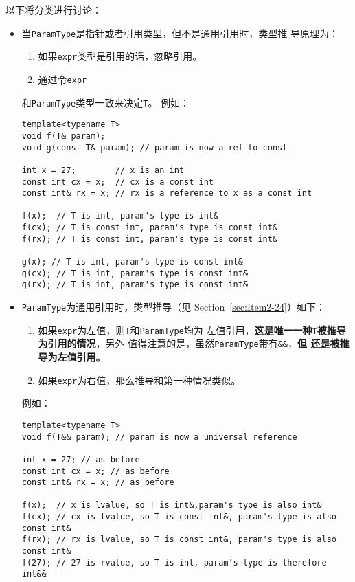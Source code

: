 以下将分类进行讨论：
\begin{itemize}
\item 当\texttt{ParamType}是指针或者引用类型，但不是通用引用时，类型推
  导原理为：
    \begin{enumerate}
    \item 如果\texttt{expr}类型是引用的话，忽略引用。
    \item 通过令\texttt{expr}
    \end{enumerate}
    和\texttt{ParamType}类型一致来决定\texttt{T}。
  例如：
\begin{verbatim}
template<typename T>
void f(T& param);
void g(const T& param); // param is now a ref-to-const

int x = 27;        // x is an int
const int cx = x;  // cx is a const int
const int& rx = x; // rx is a reference to x as a const int

f(x);  // T is int, param's type is int&
f(cx); // T is const int, param's type is const int&
f(rx); // T is const int, param's type is const int&

g(x); // T is int, param's type is const int&
g(cx); // T is int, param's type is const int&
g(rx); // T is int, param's type is const int&
\end{verbatim}

  
\item \texttt{ParamType}为通用引用时，类型推导（见
  Section~\ref{sec:Item2-24}）如下：
  \begin{enumerate}
  \item 如果\texttt{expr}为左值，则\texttt{T}和\texttt{ParamType}均为
    左值引用，\textbf{这是唯一一种\texttt{T}被推导为引用的情况}，另外
    值得注意的是，虽然\texttt{ParamType}带有\texttt{\&\&}，\textbf{但
      还是被推导为左值引用。}
  \item 如果\texttt{expr}为右值，那么推导和第一种情况类似。
  \end{enumerate}

  例如：
\begin{verbatim}
template<typename T>
void f(T&& param); // param is now a universal reference

int x = 27; // as before
const int cx = x; // as before
const int& rx = x; // as before

f(x);  // x is lvalue, so T is int&,param's type is also int&
f(cx); // cx is lvalue, so T is const int&, param's type is also const int&
f(rx); // rx is lvalue, so T is const int&, param's type is also const int&
f(27); // 27 is rvalue, so T is int, param's type is therefore int&&
\end{verbatim}


\end{itemize}
